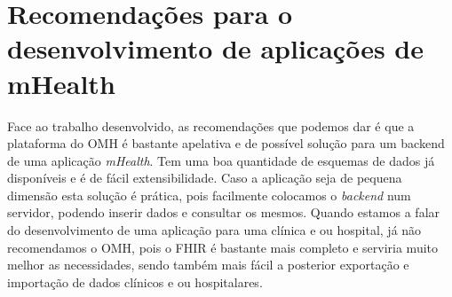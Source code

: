 \section{Recomendações para o desenvolvimento de aplicações de mHealth}


Face ao trabalho desenvolvido, as recomendações que podemos dar é que a plataforma do \gls{OMH} é bastante apelativa e de possível solução para um backend de uma aplicação \textit{mHealth}. Tem uma boa quantidade de esquemas de dados já disponíveis e é de fácil extensibilidade. Caso a aplicação seja de pequena dimensão esta solução é prática, pois facilmente colocamos o \textit{backend} num servidor, podendo inserir dados e consultar os mesmos. Quando estamos a falar do desenvolvimento de uma aplicação para uma clínica e ou hospital, já não recomendamos o \gls{OMH}, pois o \gls{FHIR} é bastante mais completo e serviria muito melhor as necessidades, sendo também mais fácil a posterior exportação e importação de dados clínicos e ou hospitalares. 

\cleardoublepage
